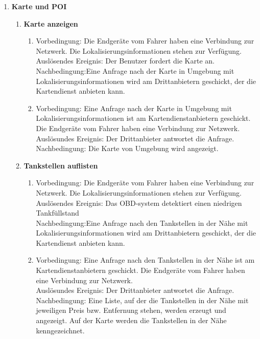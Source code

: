 \documentclass[pflichtenheft.tex]{subfiles}
\begin{document}
\begin{enumerate}
\begin{enumerate}
	\end{enumerate}
	
	
	\item{\textbf{Karte und POI}
	
	\begin{enumerate}
	
	\item{\textbf{Karte anzeigen}}
	\begin{enumerate}
		\item 
		Vorbedingung: Die Endgeräte vom Fahrer haben eine Verbindung zur Netzwerk. Die
		Lokalisierungsinformationen stehen zur Verfügung.
		\\Auslösendes Ereignis: Der Benutzer fordert die Karte an.
	 	\\Nachbedingung:Eine Anfrage nach der Karte in Umgebung mit
	 	Lokalisierungsinformationen wird am Drittanbietern geschickt, der die
	 	Kartendienst anbieten kann.
	 	\item
		Vorbedingung: Eine Anfrage nach der Karte in Umgebung mit
		Lokalisierungsinformationen ist am Kartendienstanbietern geschickt. Die
		Endgeräte vom Fahrer haben eine Verbindung zur Netzwerk.
		\\Auslösundes Ereignis: Der Drittanbieter antwortet die Anfrage.
		\\Nachbedingung: Die Karte von Umgebung wird angezeigt.
  	\end{enumerate}
  	
  	\item {\textbf{Tankstellen auflisten}}
  	\begin{enumerate} 
  		\item 
		Vorbedingung: Die Endgeräte vom Fahrer haben eine Verbindung zur Netzwerk. Die
		Lokalisierungsinformationen stehen zur Verfügung.
		\\Auslösendes Ereignis: Das OBD-system detektiert einen niedrigen
		Tankfüllstand
		\\Nachbedingung:Eine Anfrage nach den Tankstellen in der Nähe mit
	 	Lokalisierungsinformationen wird am Drittanbietern geschickt, der die
	 	Kartendienst anbieten kann.
	 	\item
		Vorbedingung: Eine Anfrage nach den Tankstellen in der Nähe ist am
		Kartendienstanbietern geschickt. Die Endgeräte vom Fahrer haben eine
		Verbindung zur Netzwerk.
		\\Auslösundes Ereignis: Der Drittanbieter antwortet die Anfrage.
		\\Nachbedingung: Eine Liste, auf der die Tankstellen in der Nähe mit
		jeweiligen Preis bzw. Entfernung stehen, werden erzeugt und angezeigt. Auf der
		Karte werden die Tankstellen in der Nähe kenngezeichnet.
  	\end{enumerate}
  	

\end{enumerate}}
\end{enumerate}
\end{document}
